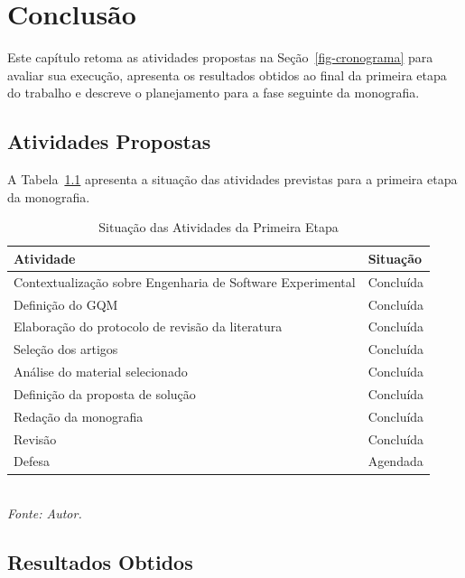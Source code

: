 \chapter[Conclusão]{Conclusão}

Este capítulo retoma as atividades propostas na Seção~\ref{fig-cronograma} para avaliar sua execução, apresenta os resultados obtidos ao final da primeira etapa do trabalho e descreve o planejamento para a fase seguinte da monografia.

\section{Atividades Propostas}

A Tabela~\ref{tab:atividades-concluidas-tcc-1} apresenta a situação das atividades previstas para a primeira etapa da monografia.

\begin{table}[H]
    \centering
    \caption{Situação das Atividades da Primeira Etapa}
    \begin{tabular}{|p{10cm}|p{3cm}|}
        \hline
        \textbf{Atividade} & \textbf{Situação} \\
        \hline
        Contextualização sobre Engenharia de Software Experimental & Concluída \\
        \hline
        Definição do GQM & Concluída \\
        \hline
        Elaboração do protocolo de revisão da literatura & Concluída \\
        \hline
        Seleção dos artigos & Concluída \\
        \hline
        Análise do material selecionado & Concluída \\
        \hline
        Definição da proposta de solução & Concluída \\
        \hline
        Redação da monografia & Concluída \\
        \hline
        Revisão & Concluída \\
        \hline
        Defesa & Agendada \\
        \hline
    \end{tabular} \\[0.5em]
    {\small\textit{Fonte: Autor.}}
    \label{tab:atividades-concluidas-tcc-1}
\end{table}

\section{Resultados Obtidos}

